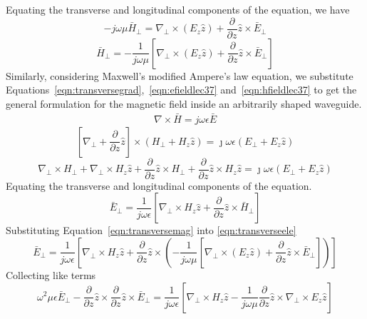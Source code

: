 Equating the transverse and longitudinal components of the equation, we have
\begin{dmath*}
-j\omega\mu\bar{H}_\bot = \nabla_\bot\times(E_z\hat{z}) + \frac{\partial}{\partial z}\hat{z}\times\bar{E}_\bot
\end{dmath*}
\begin{dmath}
\bar{H}_\bot = -\frac{1}{j\omega\mu} \left[\nabla_\bot\times(E_z\hat{z}) + \frac{\partial}{\partial z}\hat{z}\times\bar{E}_\bot\right]
\label{eqn:transversemag}
\end{dmath}
Similarly, considering Maxwell's modified Ampere's law equation, we substitute Equations~\ref{eqn:transversegrad},~\ref{eqn:efieldlec37} and~\ref{eqn:hfieldlec37} to get the general formulation for the magnetic field inside an arbitrarily shaped waveguide.
\begin{align*}
\nabla\times\bar{H} = j\omega\epsilon\bar{E}
\end{align*}
\begin{dmath*}
\left[ \nabla_\bot + \frac{\partial}{\partial z}\hat{z} \right] \times (H_\bot + H_z \hat{z}) = \jmath \omega\epsilon (E_\bot + E_z \hat{z})
\end{dmath*}
\begin{dmath*}
\nabla_\bot\times H_\bot + \nabla_\bot\times H_z \hat{z} +  \frac{\partial}{\partial z}\hat{z}\times H_\bot + \frac{\partial}{\partial z}\hat{z}\times H_z \hat{z} = \jmath \omega\epsilon (E_\bot + E_z \hat{z})
\end{dmath*}
Equating the transverse and longitudinal components of the equation.
\begin{dmath}
\bar{E}_\bot = \frac{1}{j\omega\epsilon} \left[\nabla_\bot\times H_z\hat{z} + \frac{\partial}{\partial z}\hat{z}\times\bar{H}_\bot\right]
\label{eqn:transverseele}
\end{dmath}
Substituting Equation~\ref{eqn:transversemag} into \ref{eqn:transverseele}
\begin{dmath*}
\bar{E}_\bot = \frac{1}{j\omega\epsilon} \left[\nabla_\bot\times H_z\hat{z} + \frac{\partial}{\partial z}\hat{z}\times \left( -\frac{1}{j\omega\mu} \left[\nabla_\bot\times(E_z\hat{z}) + \frac{\partial}{\partial z}\hat{z}\times\bar{E}_\bot\right] \right)\right] 
\end{dmath*}
Collecting like terms
\begin{dmath}
\omega^2\mu\epsilon\bar{E}_\bot-\frac{\partial}{\partial z}\hat{z}\times\frac{\partial}{\partial z}\hat{z}\times\bar{E}_\bot = \frac{1}{j\omega\epsilon} \left[\nabla_\bot\times H_z\hat{z} - \frac{1}{j\omega\mu}\frac{\partial}{\partial z}\hat{z}\times\nabla_\bot\times E_z \hat{z} \right]
\label{eqn:electricfieldinwg}
\end{dmath}

